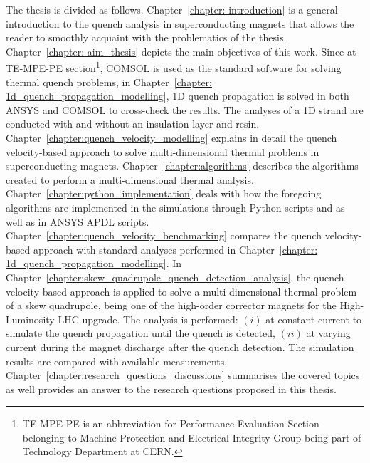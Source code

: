 
The thesis is divided as follows. Chapter~\ref{chapter: introduction} is a general introduction to the quench analysis in superconducting magnets that allows the reader to smoothly acquaint with the problematics of the thesis. Chapter~\ref{chapter: aim_thesis} depicts the main objectives of this work. Since at TE-MPE-PE section\footnote{TE-MPE-PE is an abbreviation for Performance Evaluation Section belonging to Machine Protection and Electrical Integrity Group being part of Technology Department at CERN.}, COMSOL is used as the standard software for solving thermal quench problems, in Chapter~\ref{chapter: 1d_quench_propagation_modelling}, 1D quench propagation is solved in both ANSYS and COMSOL to cross-check the results. The analyses of a 1D strand are conducted with and without an insulation layer and resin. Chapter~\ref{chapter:quench_velocity_modelling} explains in detail the quench velocity-based approach to solve multi-dimensional thermal problems in superconducting magnets.
Chapter~\ref{chapter:algorithms} describes the algorithms created to perform a multi-dimensional thermal analysis. Chapter~\ref{chapter:python_implementation} deals with how the foregoing algorithms are implemented in the simulations through Python scripts and as well as in ANSYS APDL scripts. Chapter~\ref{chapter:quench_velocity_benchmarking} compares the quench velocity-based approach with standard analyses performed in Chapter~\ref{chapter: 1d_quench_propagation_modelling}. In Chapter~\ref{chapter:skew_quadrupole_quench_detection_analysis}, the quench velocity-based approach is applied to solve a multi-dimensional thermal problem of a skew quadrupole, being one of the high-order corrector magnets for the High-Luminosity LHC upgrade. The analysis is performed: $(i)$ at constant current to simulate the quench propagation until the quench is detected, $(ii)$ at varying current during the magnet discharge after the quench detection. The simulation results are compared with available measurements. Chapter~\ref{chapter:research_questions_discussions} summarises the covered topics as well provides an answer to the research questions proposed in this thesis.


